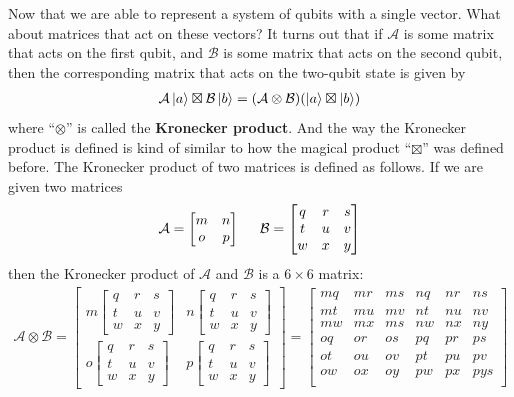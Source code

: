 \documentclass[a4paper,11pt]{article}
\numberwithin{equation}{section}
\theoremstyle{definition}
\newcommand{\A}{\mathcal{A}}
\begin{document}
Now that we are able to represent a system of qubits with a single vector. What about matrices that act on these vectors? It turns out that if $\mathcal{A}$ is some matrix that acts on the first qubit, and $\mathcal{B}$ is some matrix that acts on the second qubit, then the corresponding matrix that acts on the two-qubit state is given by
\begin{align*}
\A\ket{a} \boxtimes \mathcal{B}\ket{b} = (\A \otimes \mathcal{B})(\ket{a} \boxtimes \ket{b})
\end{align*}
where ``$\otimes$'' is called the \textbf{Kronecker product}. And the way the Kronecker product is defined is kind of similar to how the magical product ``$\boxtimes$'' was defined before. The Kronecker product of two matrices is defined as follows. If we are given two matrices
\begin{align*}
\A = \begin{bmatrix}
m & n \\ o & p
\end{bmatrix}
\hspace{0.5cm}
\mathcal{B} = \begin{bmatrix}
q & r & s \\ t & u & v \\ w&x&y
\end{bmatrix}
\end{align*} 
then the Kronecker product of $\mathcal{A}$ and $\mathcal{B}$ is a $6\times 6$ matrix:
\begin{align*}
\A \otimes \mathcal{B} = \begin{bmatrix}
m\begin{bmatrix}
q & r & s \\ t & u & v \\ w&x&y
\end{bmatrix} & n\begin{bmatrix}
q & r & s \\ t & u & v \\ w&x&y
\end{bmatrix}\\
o\begin{bmatrix}
q & r & s \\ t & u & v \\ w&x&y
\end{bmatrix} & p\begin{bmatrix}
q & r & s \\ t & u & v \\ w&x&y
\end{bmatrix}
\end{bmatrix}
=
\begin{bmatrix}
mq & mr & ms & nq & nr & ns\\
mt & mu & mv & nt & nu & nv\\
mw & mx & ms & nw & nx & ny\\
oq & or & os & pq & pr & ps\\
ot & ou & ov & pt & pu & pv\\
ow & ox & oy & pw & px & pys\\
\end{bmatrix}
\end{align*}
\end{document}
